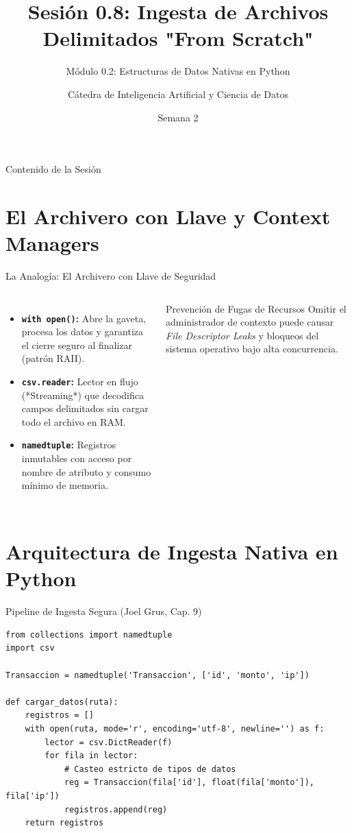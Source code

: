\documentclass[aspectratio=169]{beamer}
\title[INT210 - Sesión 0.8]{Sesión 0.8: Ingesta de Archivos Delimitados "From Scratch"}
\subtitle{Módulo 0.2: Estructuras de Datos Nativas en Python}
\author[Diplomado en Ciencia de Datos]{Cátedra de Inteligencia Artificial y Ciencia de Datos}
\institute[INT210]{Machine Learning From Scratch}
\date{Semana 2}
\begin{document}
\frame{\titlepage}

\begin{frame}{Contenido de la Sesión}
    \tableofcontents
\end{frame}

\section{El Archivero con Llave y Context Managers}

\begin{frame}{La Analogía: El Archivero con Llave de Seguridad}
    \begin{columns}
        \begin{itemize}
            \item \textbf{\texttt{with open()}:} Abre la gaveta, procesa los datos y garantiza el cierre seguro al finalizar (patrón RAII).
            \item \textbf{\texttt{csv.reader}:} Lector en flujo (*Streaming*) que decodifica campos delimitados sin cargar todo el archivo en RAM.
            \item \textbf{\texttt{namedtuple}:} Registros inmutables con acceso por nombre de atributo y consumo mínimo de memoria.
        \end{itemize}
        \begin{alertblock}{Prevención de Fugas de Recursos}
            Omitir el administrador de contexto puede causar \textit{File Descriptor Leaks} y bloqueos del sistema operativo bajo alta concurrencia.
        \end{alertblock}
    \end{columns}
\end{frame}

\section{Arquitectura de Ingesta Nativa en Python}

\begin{frame}[fragile]{Pipeline de Ingesta Segura (Joel Grus, Cap. 9)}
\begin{lstlisting}
from collections import namedtuple
import csv

Transaccion = namedtuple('Transaccion', ['id', 'monto', 'ip'])

def cargar_datos(ruta):
    registros = []
    with open(ruta, mode='r', encoding='utf-8', newline='') as f:
        lector = csv.DictReader(f)
        for fila in lector:
            # Casteo estricto de tipos de datos
            reg = Transaccion(fila['id'], float(fila['monto']), fila['ip'])
            registros.append(reg)
    return registros
\end{lstlisting}
\end{frame}
\end{document}
